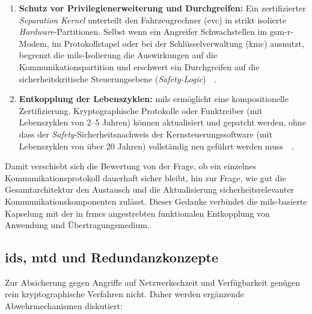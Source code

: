 \documentclass[runningheads]{res/llncs}
\begin{document}
\begin{enumerate}
    \item \textbf{Schutz vor Privilegienerweiterung und Durchgreifen:} Ein zertifizierter \textit{Separation Kernel} unterteilt den Fahrzeugrechner (\gls{evc}) in strikt isolierte \textit{Hardware}-Partitionen. Selbst wenn ein Angreifer Schwachstellen im \gls{gsm-r}-Modem, im Protokollstapel oder bei der Schlüsselverwaltung (\gls{kmc}) ausnutzt, begrenzt die \gls{mils}-Isolierung die Auswirkungen auf die Kommunikationspartition und erschwert ein Durchgreifen auf die sicherheitskritische Steuerungsebene (\textit{Safety-Logic})~\parencite[S. 32--34]{schulzIntegration2019}~\parencite[S. 80--81]{tverdyshevCertMILS2019}.
    \item \textbf{Entkopplung der Lebenszyklen:} \gls{mils} ermöglicht eine kompositionelle Zertifizierung. Kryptographische Protokolle oder Funktreiber (mit Lebenszyklen von 2--5 Jahren) können aktualisiert und gepatcht werden, ohne dass der \textit{Safety}-Sicherheitsnachweis der Kernsteuerungssoftware (mit Lebenszyklen von über 20 Jahren) vollständig neu geführt werden muss~\parencite[S. 31, 35]{schulzIntegration2019}~\parencite[S. 83]{tverdyshevCertMILS2019}.
\end{enumerate}

Damit verschiebt sich die Bewertung von der Frage, ob ein einzelnes Kommunikationsprotokoll dauerhaft sicher bleibt, hin zur Frage, wie gut die Gesamtarchitektur den Austausch und die Aktualisierung sicherheitsrelevanter Kommunikationskomponenten zulässt. Dieser Gedanke verbindet die \gls{mils}-basierte Kapselung mit der in \gls{frmcs} angestrebten funktionalen Entkopplung von Anwendung und Übertragungsmedium.

\subsection{\texorpdfstring{\gls{ids}, \gls{mtd} und Redundanzkonzepte}{IDS, MTD und Redundanzkonzepte}}
\label{sec:IDS_MTD_und_Redundanzkonzepte}
Zur Absicherung gegen Angriffe auf Netzwerkechzeit und Verfügbarkeit genügen rein kryptographische Verfahren nicht. Daher werden ergänzende Abwehrmechanismen diskutiert:
\end{document}
